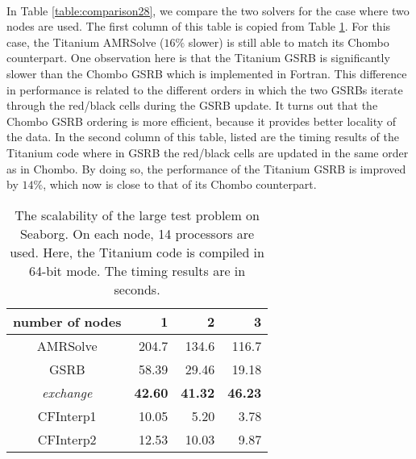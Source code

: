 \documentclass{ieee}
\numberwithin{equation}{section}
\begin{document}
\paragraph{}In Table \ref{table:comparison28}, we compare the two solvers for the case where two nodes are used. The first column of this table is copied from Table \ref{table:sLarge}. For this case, the Titanium AMRSolve ($16\%$ slower) is still able to match its Chombo counterpart. One observation here is that the Titanium GSRB is significantly slower than the Chombo GSRB which is implemented in Fortran. This difference in performance is related to the different orders in which the two GSRBs iterate through the red/black cells during the GSRB update.  It turns out that the Chombo GSRB ordering is more efficient, because it provides better locality of the data. In the second column of this table, listed are the timing results of the Titanium code where in GSRB the red/black cells are updated in the same order as in Chombo. By doing so, the performance of the Titanium GSRB is improved by $14\%$, which now is close to that of its Chombo counterpart. 

\begin{table}
\begin{center}
{\small
\begin{tabular}{|c|r|r|r|}\hline
number of nodes &1  &2     &3 \\ \hline
AMRSolve       &204.7    &134.6 &116.7 \\ \hline \hline
GSRB           &58.39    &29.46 &19.18 \\ \hline
{\it exchange} &{\bf 42.60}    &{\bf 41.32} &{\bf 46.23} \\ \hline
CFInterp1      &10.05    &5.20  &3.78 \\ \hline
CFInterp2      &12.53    &10.03 &9.87 \\ \hline
\end{tabular}
}
\caption{The scalability of the large test problem on Seaborg. On each node, 14 processors are used.  Here, the Titanium code is compiled in 64-bit mode. The timing results are in seconds.}
\label{table:sLarge}
\end{center}
\end{table}
\end{document}

